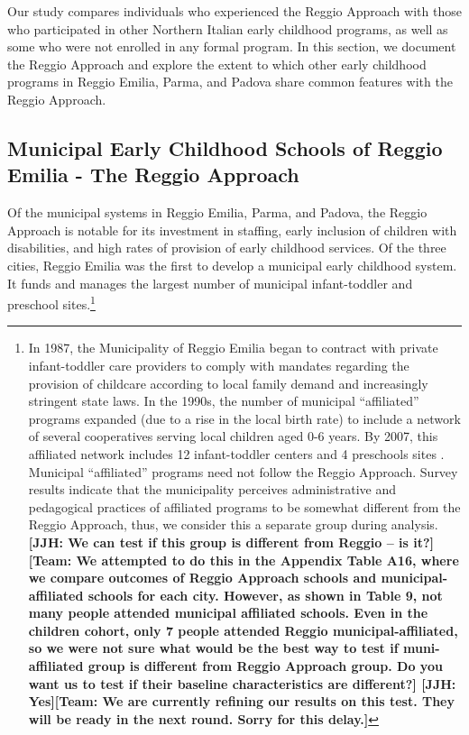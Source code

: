 Our study compares individuals who experienced the Reggio Approach with those who participated in other Northern Italian early childhood programs, as well as some who were not enrolled in any formal program. In this section, we document the Reggio Approach and explore the extent to which other early childhood programs in Reggio Emilia, Parma, and Padova share common features with the Reggio Approach.

\subsection{Municipal Early Childhood Schools of Reggio Emilia - The Reggio Approach}

Of the municipal systems in Reggio Emilia, Parma, and Padova, the Reggio Approach is notable for its investment in staffing, early inclusion of children with disabilities, and high rates of provision of early childhood services. Of the three cities, Reggio Emilia was the first to develop a municipal early childhood system. It funds and manages the largest number of municipal infant-toddler and preschool sites.\footnote{In 1987, the Municipality of Reggio Emilia began to contract with private infant-toddler care providers to comply with mandates regarding the provision of childcare according to local family demand and increasingly stringent state laws. In the 1990s, the number of municipal ``affiliated'' programs expanded (due to a rise in the local birth rate) to include a network of several cooperatives serving local children aged 0-6 years. By 2007, this affiliated network includes 12 infant-toddler centers and 4 preschools sites \citep{Infant-Toddler-Centers_2008_Reggio}. Municipal ``affiliated'' programs need not follow the Reggio Approach. Survey results indicate that the municipality perceives administrative and pedagogical practices of affiliated programs to be somewhat different from the Reggio Approach, thus, we consider this a separate group during analysis. \textbf{[JJH: We can test if this group is different from Reggio -- is it?] [Team: We attempted to do this in the Appendix Table A16, where we compare outcomes of Reggio Approach schools and municipal-affiliated schools for each city. However, as shown in Table 9, not many people attended municipal affiliated schools. Even in the children cohort, only 7 people attended Reggio municipal-affiliated, so we were not sure what would be the best way to test if muni-affiliated group is different from Reggio Approach group. Do you want us to test if their baseline characteristics are different?] [JJH: Yes][Team: We are currently refining our results on this test. They will be ready in the next round. Sorry for this delay.]}}

